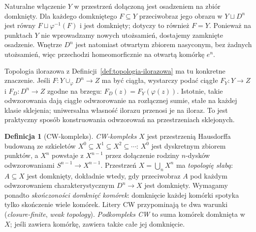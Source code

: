 \documentclass[11pt,a4paper,oneside]{report}
\theoremstyle{plain}
\theoremstyle{definition}
\newtheorem{definicja}[twierdzenie]{Definicja}
\theoremstyle{remark}
\begin{document}
Naturalne włączenie $Y$ w przestrzeń dołączoną jest osadzeniem
na zbiór domknięty. Dla każdego domkniętego $F\subseteq Y$
przeciwobraz jego obrazu w $Y\sqcup D^n$ jest równy
$F\sqcup\varphi^{-1}(F)$ i jest domknięty; dotyczy to również $F=Y$.
Ponieważ na punktach $Y$ nie wprowadzamy nowych utożsamień,
dostajemy zamknięte osadzenie. Wnętrze $D^n$ jest natomiast
otwartym zbiorem nasyconym, bez żadnych utożsamień, więc przechodzi
homeomorficznie na otwartą komórkę $e^n$.

Topologia ilorazowa z
Definicji~\ref{def:topologia-ilorazowa}
ma tu konkretne znaczenie. Jeśli
$F:Y\cup_\varphi D^n\to Z$
ma być ciągła, wystarczy podać
ciągłe $F_Y:Y\to Z$ i
$F_D:D^n\to Z$ zgodne na brzegu:
$F_D(z)=F_Y(\varphi(z))$.
Istotnie, takie odwzorowania dają ciągłe
odwzorowanie na rozłącznej sumie, stałe
na każdej klasie sklejenia;
uniwersalna własność ilorazu
przenosi je na iloraz.
To jest praktyczny sposób
konstruowania odwzorowań na przestrzeniach
sklejonych.

\begin{definicja}[CW-kompleks]
\label{def:cw-kompleks}
\emph{CW-kompleks} $X$ jest przestrzenią Hausdorffa budowaną
ze szkieletów $X^0\subseteq X^1
\subseteq X^2\subseteq\cdots$:
$X^0$ jest dyskretnym zbiorem punktów,
a $X^n$ powstaje z $X^{n-1}$
przez dołączenie rodziny $n$-dysków
odwzorowaniami $S^{n-1}\to X^{n-1}$.
Przestrzeń $X=\bigcup_n X^n$
ma \emph{topologię słabą}:
$A\subseteq X$ jest domknięty,
dokładnie wtedy, gdy przeciwobraz $A$ pod każdym
odwzorowaniem charakterystycznym $D^n\to X$
jest domknięty. Wymagamy ponadto
\emph{skończoności domknięć komórek}:
domknięcie każdej komórki
spotyka tylko skończenie wiele
komórek. Litery CW przypominają
te dwa warunki
(\emph{closure-finite}, \emph{weak topology}).
\emph{Podkompleks CW} to suma komórek
domknięta w $X$; jeśli zawiera komórkę,
zawiera także całe jej domknięcie.
\end{definicja}
\end{document}
